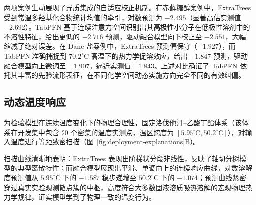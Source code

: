 两项案例生动展现了异质集成的自适应校正机制。在赤藓糖醇案例中，ExtraTrees 受到常温多羟基化合物统计均值的牵引，对数预测为 $-2.495$（显著高估实测值 $-2.692$）。TabPFN 基于连续注意力空间识别出其高极性小分子在低极性溶剂中的不溶性特征，给出更低的 $-2.716$ 预测，驱动融合模型向下校正至 $-2.551$，大幅缩减了绝对误差。在 Dane 盐案例中，ExtraTrees 预测偏保守（$-1.927$），而 TabPFN 准确捕捉到 $70.2^\circ\text{C}$ 高温下的热力学促溶效应，给出 $-1.847$ 预测，驱动融合模型向上微调至 $-1.907$，逼近实测值 $-1.843$。上述对比确证了 TabPFN 依托其丰富的先验流形表征，在不同化学空间动态实施方向完全不同的有效纠偏。

\subsection{动态温度响应}

为检验模型在连续温度变化下的物理合理性，固定洛伐他汀--乙酸丁酯体系（该体系在开发集中包含 20 个密集的温度实测点，温区跨度为 $[5.95^\circ\text{C}, 50.2^\circ\text{C}]$），对输入温度进行等距致密扫描（图~\ref{fig:deployment-explanations}B）。

扫描曲线清晰地表明：ExtraTrees 表现出阶梯状分段非线性，反映了轴切分树模型的典型离散特性；而融合模型展现出平滑、单调向上的连续响应曲线，对数溶解度预测值从 $5.95^\circ\text{C}$ 下的 $-1.587$ 稳步递增至 $50.2^\circ\text{C}$ 下的 $-1.074$；预测曲线紧密穿过真实实验观测散点簇的中枢，高度符合大多数固液溶质吸热溶解的宏观物理热力学规律，证实模型学到了物理一致的温变行为。